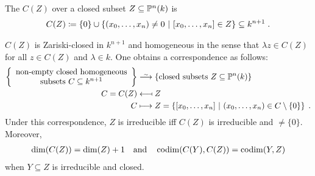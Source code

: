 \documentclass[a4paper,parskip=half,numbers=enddot, DIV=12, headheight=30pt]{scrreprt}
\begin{document}
\begin{defi}
The  $C(Z)$ over a closed subset $Z\subseteq \mathbb{P}^n(k)$ is \begin{align*}C(Z)\coloneqq\{0\} \cup \left\{(x_0,\ldots,x_n)\neq 0 \ \middle|\ 
[x_0,\ldots,x_n]\in Z\right\}\subseteq k^{n+1}\;.
\end{align*}
\end{defi}
\begin{prop}
$C(Z)$ is Zariski-closed in $k^{n+1}$ and homogeneous in the sense that $\lambda z\in C(Z)$ for all $z\in C(Z)$ and $\lambda\in k$.
One obtains a correspondence as follows:
\begin{align*}
\left\{
\begin{array}{c}
\text{non-empty closed homogeneous}\\
 \text{subsets }C\subseteq k^{n+1}
\end{array}
\right\}&\isomorphism\left\{\text{closed subsets }Z\subseteq \IP^n(k)\right\}\\
C=C(Z)&\longmapsfrom Z\\
C&\longmapsto Z = \left\{[x_0,\ldots,x_n] \st (x_0,\ldots,x_n)\in C\setminus \{0\}\right\}\;.
\end{align*}
Under this correspondence, $Z$ is irreducible iff $C(Z)$ is irreducible and $\neq\{0\}$. Moreover, 
\begin{align*}
	\dim(C(Z)) = \dim(Z)+1\quad\text{and}\quad\operatorname{codim}(C(Y),C(Z)) = \operatorname{codim}(Y,Z)
\end{align*}
 when $Y\subseteq Z$ is irreducible and closed.
\end{prop}
\end{document}
